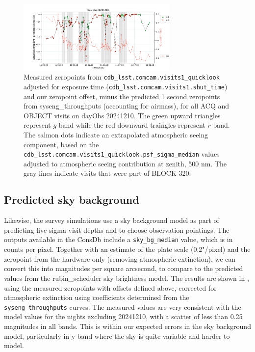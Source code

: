\begin{figure}
    \centering
    \includegraphics[width=0.7\textwidth]{sp/zeropoints_dayobs_20241210.png}
    \caption{Measured zeropoints from \texttt{cdb\_lsst.comcam.visits1\_quicklook} adjusted for exposure time (\texttt{cdb\_lsst.comcam.visits1.shut\_time}) and our zeropoint offset, minus the predicted 1 second zeropoints from syseng\_throughputs (accounting for airmass), for all ACQ and OBJECT visits on dayObs 20241210. The green upward triangles represent $g$ band while the red downward traingles represent $r$ band. The salmon dots indicate an extrapolated atmospheric seeing component, based on the \texttt{cdb\_lsst.comcam.visits1\_quicklook.psf\_sigma\_median} values adjusted to atmospheric seeing contribution at zenith, 500 nm. The gray lines indicate visits that were part of BLOCK-320. }
    \label{fig:zeropoints_dayobs_20241210}
    \end{figure}


\subsection{Predicted sky background}

Likewise, the survey simulations use a sky background model as part of predicting five sigma visit depths and to choose observation pointings. The outputs available in the ConsDb include a \texttt{sky\_bg\_median} value, which is in counts per pixel. Together with an estimate of the plate scale (0.2"/pixel) and the zeropoint from the hardware-only (removing atmospheric extinction), we can convert this into magnitudes per square arcsecond, to compare to the predicted values from the rubin\_scheduler sky brightness model. The results are shown in , using the measured zeropoints with offsets defined above, corrected for atmospheric extinction using coefficients determined from the \texttt{syseng\_throughputs} curves. The measured values are very consistent with the model values for the nights excluding 20241210, with a scatter of less than 0.25 magnitudes in all bands. This is within our expected errors in the sky background model, particularly in y band where the sky is quite variable and harder to model.

